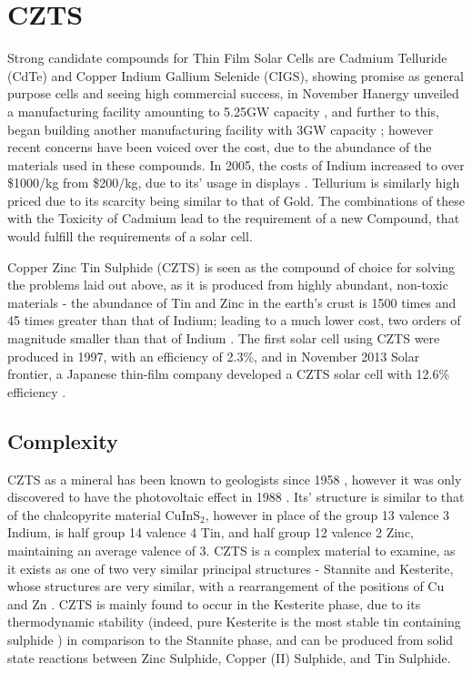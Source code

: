 \section{CZTS}

Strong candidate compounds for Thin Film Solar Cells are Cadmium Telluride (CdTe) and Copper Indium Gallium Selenide (CIGS), showing promise as general purpose cells and seeing high commercial success, in November Hanergy unveiled a manufacturing facility amounting to 5.25GW capacity \citep{Mark}, and further to this, began building another manufacturing facility with 3GW capacity \citep{FinlayColville}; however recent concerns have been voiced over the cost, due to the abundance of the materials used in these compounds. In 2005, the costs of Indium increased to over \$1000/kg from \$200/kg, due to its' usage in displays \citep{Feltrin2008}. Tellurium is similarly high priced due to its scarcity being similar to that of Gold. The combinations of these with the Toxicity of Cadmium lead to the requirement of a new Compound, that would fulfill the requirements of a solar cell.

Copper Zinc Tin Sulphide (CZTS) is seen as the compound of choice for solving the problems laid out above, as it is produced from highly abundant, non-toxic materials - the abundance of Tin and Zinc in the earth's crust is 1500 times and 45 times greater than that of Indium; leading to a much lower cost, two orders of magnitude smaller than that of Indium \citep{Wadia2009,Wang2011}.
The first solar cell using CZTS were produced in 1997, with an efficiency of 2.3\%, and in November 2013 Solar frontier, a Japanese thin-film company developed a CZTS solar cell with 12.6\% efficiency \citep{Wang2013}.


\subsection{Complexity}

CZTS as a mineral has been known to geologists since 1958 \citep{Kissin1989}, however it was only discovered to have the photovoltaic effect in 1988 \citep{Ito1988}. Its' structure is similar to that of the chalcopyrite material CuInS$_2$, however in place of the group 13 valence 3 Indium, is half group 14 valence 4 Tin, and half group 12 valence 2 Zinc, maintaining an average valence of 3. CZTS is a complex material to examine, as it exists as one of two very similar principal structures - Stannite and Kesterite, whose structures are very similar, with a rearrangement of the positions of Cu and Zn \citep{Schorr2007}. CZTS is mainly found to occur in the Kesterite phase, due to its thermodynamic stability (indeed, pure Kesterite is the most stable tin containing sulphide \citep{moh1975}) in comparison to the Stannite phase, and can be produced from solid state reactions between Zinc Sulphide, Copper (II) Sulphide, and Tin Sulphide.

